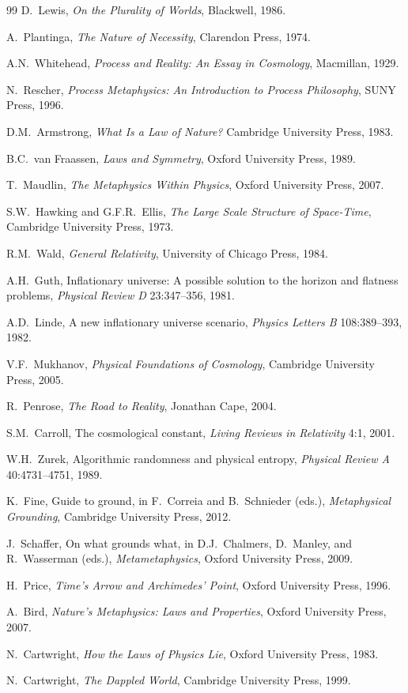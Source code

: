 \documentclass[11pt,a4paper]{article}
\theoremstyle{plain}
\theoremstyle{definition}
\theoremstyle{remark}
\begin{document}
\begin{thebibliography}{99}
D.\ Lewis,
\emph{On the Plurality of Worlds},
Blackwell, 1986.

A.\ Plantinga,
\emph{The Nature of Necessity},
Clarendon Press, 1974.

A.N.\ Whitehead,
\emph{Process and Reality: An Essay in Cosmology},
Macmillan, 1929.

N.\ Rescher,
\emph{Process Metaphysics: An Introduction to Process Philosophy},
SUNY Press, 1996.

D.M.\ Armstrong,
\emph{What Is a Law of Nature?}
Cambridge University Press, 1983.

B.C.\ van Fraassen,
\emph{Laws and Symmetry},
Oxford University Press, 1989.

T.\ Maudlin,
\emph{The Metaphysics Within Physics},
Oxford University Press, 2007.

S.W.\ Hawking and G.F.R.\ Ellis,
\emph{The Large Scale Structure of Space-Time},
Cambridge University Press, 1973.

R.M.\ Wald,
\emph{General Relativity},
University of Chicago Press, 1984.

A.H.\ Guth,
Inflationary universe: A possible solution to the horizon and flatness problems,
\emph{Physical Review D} 23:347--356, 1981.

A.D.\ Linde,
A new inflationary universe scenario,
\emph{Physics Letters B} 108:389--393, 1982.

V.F.\ Mukhanov,
\emph{Physical Foundations of Cosmology},
Cambridge University Press, 2005.

R.\ Penrose,
\emph{The Road to Reality},
Jonathan Cape, 2004.

S.M.\ Carroll,
The cosmological constant,
\emph{Living Reviews in Relativity} 4:1, 2001.

W.H.\ Zurek,
Algorithmic randomness and physical entropy,
\emph{Physical Review A} 40:4731--4751, 1989.

K.\ Fine,
Guide to ground,
in F.\ Correia and B.\ Schnieder (eds.), \emph{Metaphysical Grounding}, Cambridge University Press, 2012.

J.\ Schaffer,
On what grounds what,
in D.J.\ Chalmers, D.\ Manley, and R.\ Wasserman (eds.), \emph{Metametaphysics}, Oxford University Press, 2009.

H.\ Price,
\emph{Time's Arrow and Archimedes' Point},
Oxford University Press, 1996.

A.\ Bird,
\emph{Nature's Metaphysics: Laws and Properties},
Oxford University Press, 2007.

N.\ Cartwright,
\emph{How the Laws of Physics Lie},
Oxford University Press, 1983.

N.\ Cartwright,
\emph{The Dappled World},
Cambridge University Press, 1999.

\end{thebibliography}
\end{document}
